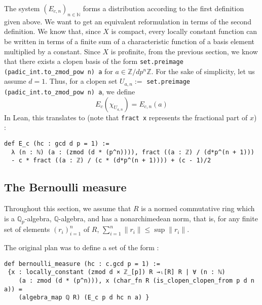 \documentclass[a4paper,UKenglish,cleveref, autoref, thm-restate]{lipics-v2021}
\newcommand{\lean}[1]{\texttt{#1}\xspace} %
\begin{document}
The system $(E_{c,n})_{n \in \mathbb{N}}$ forms a distribution according to the first definition
given above. We want to get an equivalent reformulation in terms of the second definition.
We know that, since $X$ is compact, every locally constant function can be written in terms of a
finite sum of a characteristic function of a basis element multiplied by a constant. Since $X$ is
profinite, from the previous section, we know that there exists a clopen basis of the form
\lean{set.preimage (padic\_int.to\_zmod\_pow n) {a}} for $a \in\mathbb{Z}/dp^{n} \mathbb{Z}$. 
For the sake of simplicity, let us assume $d = 1$. Thus, for a
clopen set $U_{a,n} := $ \lean{set.preimage (padic\_int.to\_zmod\_pow n) {a}}, we define
$$ E_c (\chi_{U_{a,n}}) = E_{c,n} (a) $$
In Lean, this translates to (note that \lean{fract x} represents the fractional part of $x$) :
\begin{lstlisting}
def E_c (hc : gcd d p = 1) := 
  λ (n : ℕ) (a : (zmod (d * (p^n)))), fract ((a : ℤ) / (d*p^(n + 1))) 
  - c * fract ((a : ℤ) / (c * (d*p^(n + 1)))) + (c - 1)/2
\end{lstlisting}


\subsection{The Bernoulli measure}
Throughout this section, we assume that $R$ is a normed commutative ring which is a $\mathbb{Q}_p$-algebra, 
$\mathbb{Q}$-algebra, and has a nonarchimedean norm, that is, for any finite set of elements 
$(r_i)_{i = 1}^n$ of $R$, $\sum_{i = 1}^n \parallel r_i \parallel \le \sup \parallel r_i \parallel$.

The original plan was to define a set of the form : 
\begin{lstlisting}
def bernoulli_measure (hc : c.gcd p = 1) :=
 {x : locally_constant (zmod d × ℤ_[p]) R →ₗ[R] R | ∀ (n : ℕ) 
    (a : zmod (d * (p^n))), x (char_fn R (is_clopen_clopen_from p d n a)) = 
    (algebra_map ℚ R) (E_c p d hc n a) }
\end{lstlisting}
\end{document}
